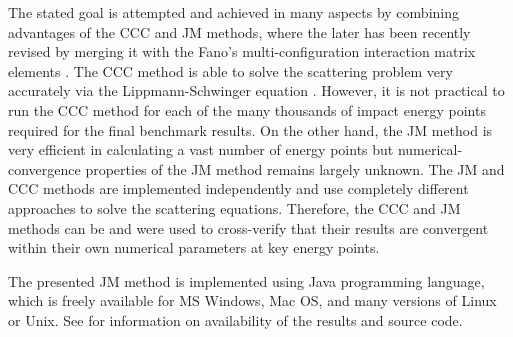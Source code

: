 \documentclass[aip
, pra
, showpacs
, aps
, twocolumn
, groupedaddress
, floatfix
]{revtex4}
\begin{document}
The stated goal is attempted and achieved in many aspects by combining advantages of the CCC and JM methods,
where the later has been recently revised \cite{KFB11} by merging it with the Fano's multi-configuration interaction matrix elements \cite{Fano65}.
The CCC method is able to solve the scattering problem very accurately via the Lippmann-Schwinger equation \cite{BS92p6995}.
However, it is not practical to run the CCC method for each of the many thousands of impact energy points required for the final benchmark results.
On the other hand, the JM method is very efficient \cite{HY74p1201,BR76p1491} in calculating a vast number of energy points
but numerical-convergence properties of the JM method remains largely unknown.
The JM and CCC methods are implemented independently and use completely different approaches to solve the scattering equations.
Therefore, the CCC and JM methods can be and were used to cross-verify that their results are convergent within their own numerical parameters at key energy points.

The presented JM method is implemented using Java programming language, which is freely available for MS Windows,
Mac OS, and many versions of Linux or Unix. See \cite{JMatrixWebsite} for information on availability of the results and source code.
\end{document}

